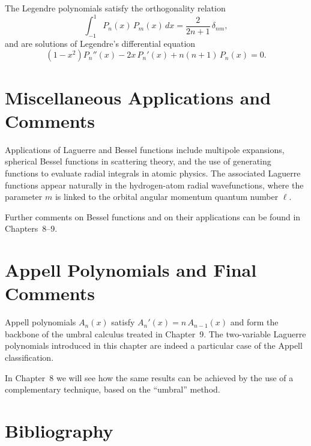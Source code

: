 The Legendre polynomials satisfy the orthogonality relation
\begin{equation}
\int_{-1}^{1} P_n(x)\,P_m(x)\,dx = \frac{2}{2n+1}\,\delta_{nm},
\label{eq:4.6.2}
\end{equation}
and are solutions of Legendre's differential equation
\begin{equation}
(1-x^2)P_n''(x) - 2x\,P_n'(x) + n(n+1)\,P_n(x) = 0.
\label{eq:4.6.3}
\end{equation}

\section{Miscellaneous Applications and Comments}

Applications of Laguerre and Bessel functions include multipole expansions,
spherical Bessel functions in scattering theory, and the use of generating
functions to evaluate radial integrals in atomic physics. The associated
Laguerre functions appear naturally in the hydrogen-atom radial
wavefunctions, where the parameter $m$ is linked to the orbital angular
momentum quantum number $\ell$.

Further comments on Bessel functions and on their applications can be
found in Chapters~8--9.

\section{Appell Polynomials and Final Comments}

Appell polynomials $A_n(x)$ satisfy $A_n'(x) = n\,A_{n-1}(x)$ and form
the backbone of the umbral calculus treated in Chapter~9. The two-variable
Laguerre polynomials introduced in this chapter are indeed a particular
case of the Appell classification.

In Chapter~8 we will see how the same results can be achieved by the use
of a complementary technique, based on the ``umbral'' method.

\section*{Bibliography}

